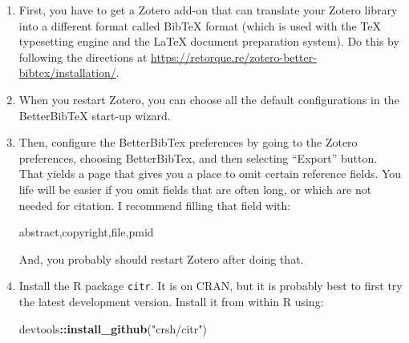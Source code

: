 \documentclass[]{krantz}
\makeatletter
\newenvironment{Shaded}{\begin{snugshade}}{\end{snugshade}}
\newcommand{\KeywordTok}[1]{\textcolor[rgb]{0.27,0.27,0.27}{\textbf{#1}}}
\newcommand{\NormalTok}[1]{#1}
\newcommand{\OperatorTok}[1]{\textcolor[rgb]{0.43,0.43,0.43}{\textbf{#1}}}
\newcommand{\StringTok}[1]{\textcolor[rgb]{0.5,0.5,0.5}{#1}}
\newenvironment{kframe}{%
\medskip{}
\setlength{\fboxsep}{.8em}
 \def\at@end@of@kframe{}%
 \ifinner\ifhmode%
  \def\at@end@of@kframe{\end{minipage}}%
  \begin{minipage}{\columnwidth}%
 \fi\fi%
 \def\FrameCommand##1{\hskip\@totalleftmargin \hskip-\fboxsep
 \colorbox{shadecolor}{##1}\hskip-\fboxsep
     \hskip-\linewidth \hskip-\@totalleftmargin \hskip\columnwidth}%
 \MakeFramed {\advance\hsize-\width
   \@totalleftmargin\z@ \linewidth\hsize
   \@setminipage}}%
 {\par\unskip\endMakeFramed%
 \at@end@of@kframe}
\renewenvironment{Shaded}{\begin{kframe}}{\end{kframe}}
\makeatother
\begin{document}
\begin{enumerate}
\def\labelenumi{\arabic{enumi}.}
\item
  First, you have to get a Zotero add-on that can translate your Zotero
  library into a different format called BibTeX format (which is used with the
  TeX typesetting engine and the LaTeX document preparation system). Do this by
  following the directions at \url{https://retorque.re/zotero-better-bibtex/installation/}.
\item
  When you restart Zotero, you can choose all the default configurations
  in the BetterBibTeX start-up wizard.
\item
  Then, configure the BetterBibTex preferences by going to the Zotero preferences,
  choosing BetterBibTex, and then selecting ``Export'' button. That yields a page
  that gives you a place to omit certain reference fields. You life will be easier
  if you omit fields that are often long, or which are not needed for citation. I recommend
  filling that field with:

\begin{Shaded}
\begin{Highlighting}[]
\NormalTok{abstract,copyright,file,pmid}
\end{Highlighting}
\end{Shaded}

  And, you probably should restart Zotero after doing that.
\item
  Install the R package \texttt{citr}. It is on CRAN, but it is probably best
  to first try the latest development version. Install it from within R using:

\begin{Shaded}
\begin{Highlighting}[]
\NormalTok{devtools}\OperatorTok{::}\KeywordTok{install_github}\NormalTok{(}\StringTok{"crsh/citr"}\NormalTok{)}
\end{Highlighting}
\end{Shaded}


\end{enumerate}
\end{document}
